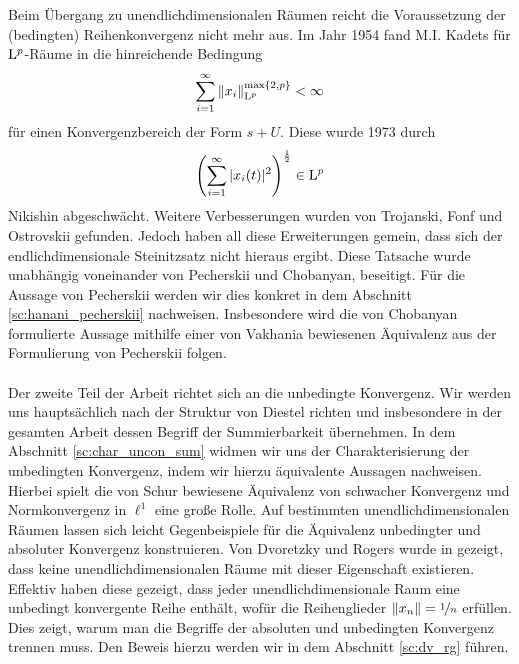 Beim Übergang zu unendlichdimensionalen Räumen reicht die Voraussetzung der (bedingten) Reihenkonvergenz nicht mehr aus.
Im Jahr 1954 fand M.I. Kadets für $ \mathrm{L}^p $-Räume in \cite{Kadets1954} die hinreichende Bedingung
\begin{align*}
	\sum \limits_{ i = 1}^\infty \| x_i \|^{\max\{2,p\}}_{\mathrm{L}^p} < \infty
\end{align*}
für einen Konvergenzbereich der Form $ s + U. $ Diese wurde 1973 
durch
\begin{align*}
	\left(\sum \limits_{ i = 1}^\infty | x_i(t) |^2\right)^\frac{1}{2} \in \mathrm{L}^p
\end{align*}
Nikishin\cite{Nikishin1973} abgeschwächt.
Weitere Verbesserungen wurden von Trojanski\cite{Trojanski1967}, Fonf\cite{Fonf1972} und Ostrovskii\cite{Ostrovskii1986} gefunden.
Jedoch haben all diese Erweiterungen gemein, dass sich der endlichdimensionale Steinitzsatz nicht hieraus ergibt.
Diese Tatsache wurde unabhängig voneinander von Pecherskii \cite{Pecherski1989} und Chobanyan\cite{Chobanyan1987},\cite{Chobanyan1989} beseitigt.
Für die Aussage von Pecherskii werden wir dies konkret in dem Abschnitt \ref{sc:hanani_pecherskii} nachweisen.
Insbesondere wird die von Chobanyan formulierte Aussage mithilfe einer von Vakhania\cite{Vakhania:1987} bewiesenen Äquivalenz aus der Formulierung von Pecherskii folgen.\\
\\
Der zweite Teil der Arbeit richtet sich an die unbedingte Konvergenz.
Wir werden uns hauptsächlich nach der Struktur von Diestel\cite{Diestel1995} richten und insbesondere in der gesamten Arbeit dessen Begriff der Summierbarkeit übernehmen.
In dem Abschnitt \ref{sc:char_uncon_sum} widmen wir uns der Charakterisierung der unbedingten Konvergenz, indem wir hierzu äquivalente Aussagen nachweisen. Hierbei spielt die von Schur\cite{Schur1920} bewiesene Äquivalenz von schwacher Konvergenz und Normkonvergenz in $ \ell^1 $ eine große Rolle.
Auf bestimmten unendlichdimensionalen Räumen lassen sich leicht Gegenbeispiele für die Äquivalenz unbedingter und absoluter Konvergenz konstruieren.
Von Dvoretzky und Rogers wurde in  \cite{DvoretzkyRogers1950} gezeigt, dass keine unendlichdimensionalen Räume mit dieser Eigenschaft existieren. 
Effektiv haben diese gezeigt, dass jeder unendlichdimensionale Raum eine unbedingt konvergente Reihe enthält, wofür die Reihenglieder $ \| x_n \| = \nicefrac{1}{n} $ erfüllen. Dies zeigt, warum man die Begriffe der absoluten und unbedingten Konvergenz trennen muss. Den Beweis hierzu werden wir in dem Abschnitt \ref{sc:dv_rg} führen.
